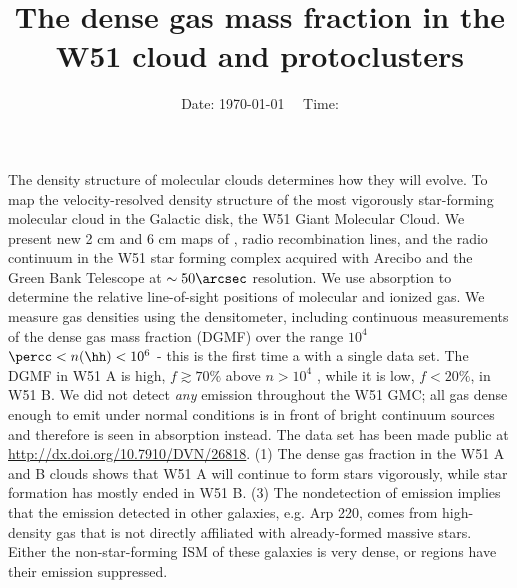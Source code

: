 



\title{The dense gas mass fraction in the W51 cloud and protoclusters}



\date{Date: \today ~~ Time: \currenttime}

%

\abstract
{The density structure of molecular clouds determines how they will evolve.}
{To map the velocity-resolved density structure of the most vigorously
star-forming molecular cloud in the Galactic disk, the W51 Giant Molecular
Cloud.}
{
We present new 2 cm and 6 cm maps of \formaldehyde, radio recombination lines,
and the radio continuum in the W51 star forming complex acquired with Arecibo
and the Green Bank Telescope at $\sim50\arcsec$ resolution.
We use \formaldehyde absorption to determine the relative line-of-sight
positions of molecular and ionized gas.  We measure gas densities using the
\formaldehyde densitometer, including continuous measurements of the dense gas
mass
fraction (DGMF) over the range $10^4$ $\percc< n(\hh) < 10^6$ \percc - this is
the first time a  with a single data set.}
{The DGMF in W51 A is high, $f\gtrsim70\%$ above $n>10^4$
\percc, while it is low, $f<20\%$, in W51 B.
We did not detect \emph{any} \formaldehyde emission throughout the W51 GMC; all
gas dense enough to emit under normal conditions is in front of bright
continuum sources and therefore is seen in absorption instead.  
The data set has been made public at \protect\url{http://dx.doi.org/10.7910/DVN/26818}.
}
{(1) The dense gas fraction in the W51 A and B clouds shows that W51 A will
continue to form stars vigorously, while star formation has mostly ended in W51
B.  
(3) The nondetection of \formaldehyde emission implies that the  emission
detected in other galaxies, e.g. Arp 220, comes from high-density gas that is
not directly affiliated with already-formed massive stars.  Either the
non-star-forming ISM of these galaxies is very dense, or \hii regions have
their emission suppressed.
}
